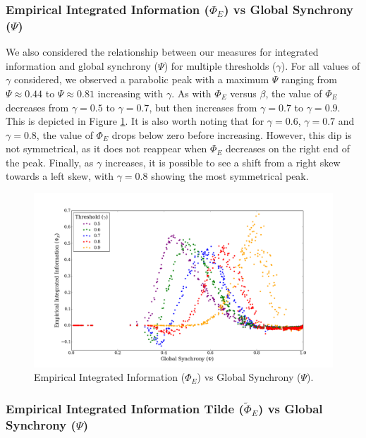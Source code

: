 \documentclass[a4paper,11pt]{article}
\begin{document}
\subsubsection{Empirical Integrated Information ($\Phi_{E}$) vs Global Synchrony ($\Psi$)}
\label{sec:app:osc:res:phi-v-psi}

We also considered the relationship between our measures for integrated information and global synchrony ($\Psi$) for multiple thresholds ($\gamma$). For all values of $\gamma$ considered, we observed a parabolic peak with a maximum $\Psi$ ranging from $\Psi \approx 0.44$ to $\Psi \approx 0.81$ increasing with $\gamma$. As with $\Phi_{E}$ versus $\beta$, the value of $\Phi_E$ decreases from $\gamma = 0.5$ to $\gamma = 0.7$, but then increases from $\gamma = 0.7$ to $\gamma = 0.9$. This is depicted in Figure \ref{fig:phi-vs-psi-multi}. It is also worth noting that for $\gamma = 0.6$, $\gamma = 0.7$ and $\gamma = 0.8$, the value of $\Phi_E$ drops below zero before increasing. However, this dip is not symmetrical, as it does not reappear when $\Phi_E$ decreases on the right end of the peak. Finally, as $\gamma$ increases, it is possible to see a shift from a right skew towards a left skew, with $\gamma = 0.8$ showing the most symmetrical peak. 

\begin{figure}[H]
\begin{center}
\includegraphics[scale = 0.35]{figures/phi_vs_psi_multi}
\caption{
	Empirical Integrated Information ($\Phi_E$) vs Global Synchrony ($\Psi$).
	\label{fig:phi-vs-psi-multi}
}
\end{center}
\end{figure}

\subsubsection{Empirical Integrated Information Tilde ($\widetilde{\Phi}_{E}$) vs Global Synchrony ($\Psi$)}
\label{sec:app:osc:res:phi-tilde-v-psi}
\end{document}
